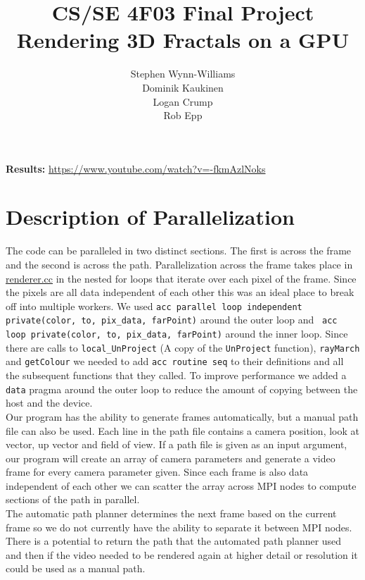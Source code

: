 \documentclass[]{article}
\title{CS/SE 4F03 Final Project \\ Rendering 3D Fractals on a GPU}
\author{Stephen Wynn-Williams \\ Dominik Kaukinen \\Logan Crump \\ Rob Epp }
\begin{document}
\maketitle
\begin{center}
\textbf{Results:} \url{https://www.youtube.com/watch?v=-fkmAzlNoks}
\end{center}


\newpage
\tableofcontents

\newpage
\section{Description of Parallelization}
The code can be paralleled in two distinct sections. The first is across the frame and the second is across the path. Parallelization across the frame takes place in \hyperref[subsec:renderer.cc]{renderer.cc} in the nested for loops that iterate over each pixel of the frame. Since the pixels are all data independent of each other this was an ideal place to break off into multiple workers. We used \texttt{acc parallel loop independent private(color, to, pix\_data, farPoint)} around the outer loop and \texttt{ acc loop private(color, to, pix\_data, farPoint)} around the inner loop. Since there are calls to \texttt{local\_UnProject} (A copy of the \texttt{UnProject} function), \texttt{rayMarch} and \texttt{getColour} we needed to add \texttt{acc routine seq} to their definitions and all the subsequent functions that they called. To improve performance we added a \texttt{data} pragma around the outer loop to reduce the amount of copying between the host and the device. \\

Our program has the ability to generate frames automatically, but a manual path file can also be used. Each line in the path file contains a camera position, look at vector, up vector and field of view. If a path file is given as an input argument, our program will create an array of camera parameters and generate a video frame for every camera parameter given. Since each frame is also data independent of each other we can scatter the array across MPI nodes to compute sections of the path in parallel. \\

The automatic path planner determines the next frame based on the current frame so we do not currently have the ability to separate it between MPI nodes. There is a potential to return the path that the automated path planner used and then if the video needed to be rendered again at higher detail or resolution it could be used as a manual path.
\end{document}
